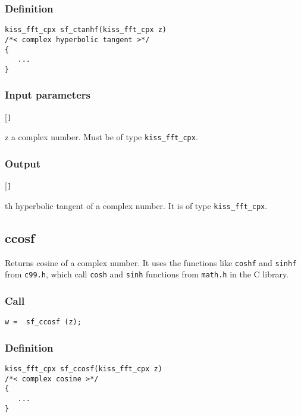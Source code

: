 \subsubsection*{Definition}
\begin{verbatim}
kiss_fft_cpx sf_ctanhf(kiss_fft_cpx z)
/*< complex hyperbolic tangent >*/
{
   ...
}
\end{verbatim}

\subsubsection*{Input parameters}
\begin{desclist}{\tt }{\quad}[\tt ]
   \setlength\itemsep{0pt}
   \item[z] a complex number. Must be of type \texttt{kiss\_fft\_cpx}.
\end{desclist}

\subsubsection*{Output}
\begin{desclist}{\tt }{\quad}[\tt ]
   \setlength\itemsep{0pt}
   \item[th] hyperbolic tangent of a complex number. It is of type \texttt{kiss\_fft\_cpx}.
\end{desclist}




\subsection{{ccosf}}
Returns cosine of a complex number. It uses the functions like \texttt{coshf} and \texttt{sinhf} from \texttt{c99.h}, which call \texttt{cosh} and \texttt{sinh} functions from \texttt{math.h} in the C library.

\subsubsection*{Call}
\begin{verbatim}w =  sf_ccosf (z);\end{verbatim}

\subsubsection*{Definition}
\begin{verbatim}
kiss_fft_cpx sf_ccosf(kiss_fft_cpx z)
/*< complex cosine >*/
{
   ...
}
\end{verbatim}

